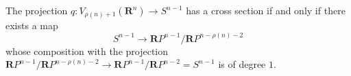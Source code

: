 The projection $q : V_{\rho(n)+1}(\mathbf{R}^n) \to S^{n-1}$ has a cross section if and only if there exists a map
\[
S^{n-1} \to \mathbf{R}P^{n-1}/\mathbf{R}P^{n-\rho(n)-2}
\]
whose composition with the projection $\mathbf{R}P^{n-1}/\mathbf{R}P^{n-\rho(n)-2} \to \mathbf{R}P^{n-1}/\mathbf{R}P^{n-2} = S^{n-1}$ is of degree $1$.
